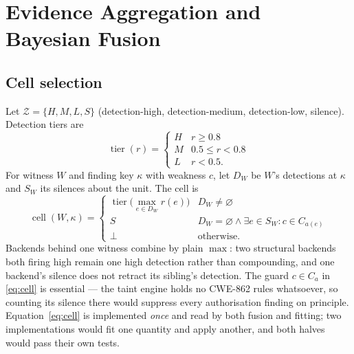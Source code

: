 \documentclass[conference]{IEEEtran}
\newcommand{\Cells}{\mathcal{Z}}
\newcommand{\tierop}{\operatorname{tier}}
\newcommand{\cellop}{\operatorname{cell}}
\begin{document}
\section{Evidence Aggregation and Bayesian Fusion}

\subsection{Cell selection}
Let $\Cells=\{H, M, L, S\}$ (detection-high, detection-medium, detection-low, silence).
Detection tiers are
\begin{equation}
\tierop(r) = \begin{cases} H & r \ge 0.8\\ M & 0.5 \le r < 0.8\\ L & r < 0.5. \end{cases}
\end{equation}
For witness $W$ and finding key $\kappa$ with weakness $c$, let $D_W$ be $W$'s detections at
$\kappa$ and $S_W$ its silences about the unit. The cell is
\begin{equation}
\cellop(W,\kappa) =
\begin{cases}
\tierop\bigl(\max_{e \in D_W} r(e)\bigr) & D_W \neq \varnothing\\[3pt]
S & D_W=\varnothing \wedge \exists e \in S_W: c \in C_{a(e)}\\[3pt]
\bot & \text{otherwise.}
\end{cases}
\label{eq:cell}
\end{equation}
Backends behind one witness combine by plain $\max$: two structural backends both firing high
remain one high detection rather than compounding, and one backend's silence does not retract
its sibling's detection. The guard $c \in C_a$ in \eqref{eq:cell} is essential --- the taint
engine holds no CWE-862 rules whatsoever, so counting its silence there would suppress every
authorisation finding on principle. Equation~\eqref{eq:cell} is implemented \emph{once} and
read by both fusion and fitting; two implementations would fit one quantity and apply
another, and both halves would pass their own tests.
\end{document}
